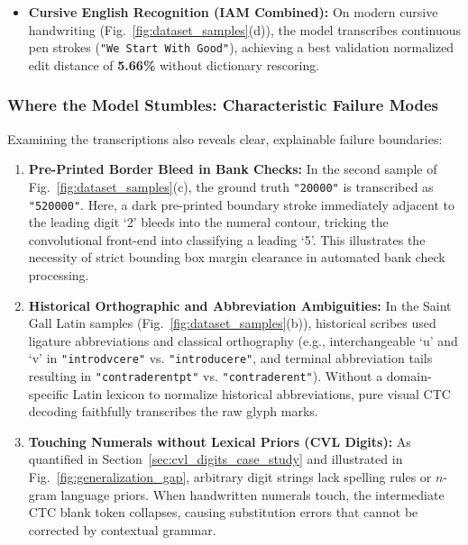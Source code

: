 \documentclass{IEEEtran}
\begin{document}
\begin{itemize}
    \item \textbf{Cursive English Recognition (IAM Combined):} On modern cursive handwriting (Fig.~\ref{fig:dataset_samples}(d)), the model transcribes continuous pen strokes (\texttt{"We Start With Good"}), achieving a best validation normalized edit distance of \textbf{5.66\%} without dictionary rescoring.
\end{itemize}

\subsubsection{Where the Model Stumbles: Characteristic Failure Modes}

Examining the transcriptions also reveals clear, explainable failure boundaries:

\begin{enumerate}
    \item \textbf{Pre-Printed Border Bleed in Bank Checks:} In the second sample of Fig.~\ref{fig:dataset_samples}(c), the ground truth \texttt{"20000"} is transcribed as \texttt{"520000"}. Here, a dark pre-printed boundary stroke immediately adjacent to the leading digit `2' bleeds into the numeral contour, tricking the convolutional front-end into classifying a leading `5'. This illustrates the necessity of strict bounding box margin clearance in automated bank check processing.
    
    \item \textbf{Historical Orthographic and Abbreviation Ambiguities:} In the Saint Gall Latin samples (Fig.~\ref{fig:dataset_samples}(b)), historical scribes used ligature abbreviations and classical orthography (e.g., interchangeable `u' and `v' in \texttt{"introdvcere"} vs. \texttt{"introducere"}, and terminal abbreviation tails resulting in \texttt{"contraderentpt"} vs. \texttt{"contraderent"}). Without a domain-specific Latin lexicon to normalize historical abbreviations, pure visual CTC decoding faithfully transcribes the raw glyph marks.
    
    \item \textbf{Touching Numerals without Lexical Priors (CVL Digits):} As quantified in Section~\ref{sec:cvl_digits_case_study} and illustrated in Fig.~\ref{fig:generalization_gap}, arbitrary digit strings lack spelling rules or $n$-gram language priors. When handwritten numerals touch, the intermediate CTC blank token collapses, causing substitution errors that cannot be corrected by contextual grammar.
\end{enumerate}
\end{document}
